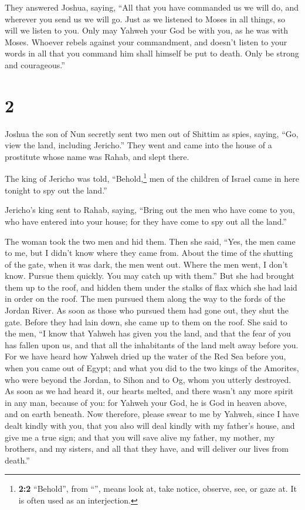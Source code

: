  They answered Joshua, saying, ``All that you have
commanded us we will do, and wherever you send us we will go.
 Just as we listened to Moses in all things, so will we
listen to you. Only may Yahweh your God be with you, as he was with
Moses.  Whoever rebels against your commandment, and
doesn't listen to your words in all that you command him shall himself
be put to death. Only be strong and courageous.''

\hypertarget{section-1}{%
\section{2}\label{section-1}}

 Joshua the son of Nun secretly sent two men out of
Shittim as spies, saying, ``Go, view the land, including Jericho.'' They
went and came into the house of a prostitute whose name was Rahab, and
slept there.

 The king of Jericho was told, ``Behold,\footnote{\textbf{2:2}
  ``Behold'', from ``'', means look at, take notice,
  observe, see, or gaze at. It is often used as an interjection.} men of
the children of Israel came in here tonight to spy out the land.''

 Jericho's king sent to Rahab, saying, ``Bring out the men
who have come to you, who have entered into your house; for they have
come to spy out all the land.''

 The woman took the two men and hid them. Then she said,
``Yes, the men came to me, but I didn't know where they came from.
 About the time of the shutting of the gate, when it was
dark, the men went out. Where the men went, I don't know. Pursue them
quickly. You may catch up with them.''  But she had
brought them up to the roof, and hidden them under the stalks of flax
which she had laid in order on the roof.  The men pursued
them along the way to the fords of the Jordan River. As soon as those
who pursued them had gone out, they shut the gate.  Before
they had lain down, she came up to them on the roof.  She
said to the men, ``I know that Yahweh has given you the land, and that
the fear of you has fallen upon us, and that all the inhabitants of the
land melt away before you.  For we have heard how Yahweh
dried up the water of the Red Sea before you, when you came out of
Egypt; and what you did to the two kings of the Amorites, who were
beyond the Jordan, to Sihon and to Og, whom you utterly destroyed.
 As soon as we had heard it, our hearts melted, and there
wasn't any more spirit in any man, because of you: for Yahweh your God,
he is God in heaven above, and on earth beneath.  Now
therefore, please swear to me by Yahweh, since I have dealt kindly with
you, that you also will deal kindly with my father's house, and give me
a true sign;  and that you will save alive my father, my
mother, my brothers, and my sisters, and all that they have, and will
deliver our lives from death.''

